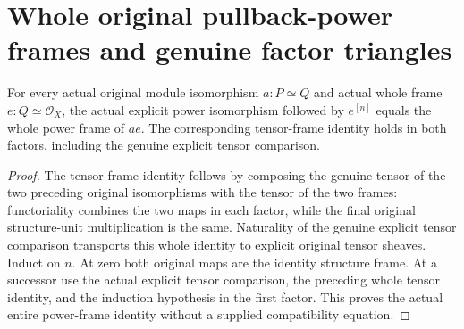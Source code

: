 \section{Whole original pullback-power frames and genuine factor triangles}

\begin{lemma}\label{lem:fc-actual-power-frame-iso-naturality}
\leanok
{}
For every actual original module isomorphism $a:P\simeq Q$ and
actual whole frame $e:Q\simeq\mathcal O_X$, the actual explicit
power isomorphism followed by $e^{[n]}$ equals the whole power
frame of $ae$. The corresponding tensor-frame identity holds in
both factors, including the genuine explicit tensor comparison.
\end{lemma}
\begin{proof}
The tensor frame identity follows by composing the genuine tensor
of the two preceding original isomorphisms with the tensor of the
two frames: functoriality combines the two maps in each factor,
while the final original structure-unit multiplication is the same.
Naturality of the genuine explicit tensor comparison transports
this whole identity to explicit original tensor sheaves. Induct
on $n$. At zero both original maps are the identity structure
frame. At a successor use the actual explicit tensor comparison,
the preceding whole tensor identity, and the induction hypothesis
in the first factor. This proves the actual entire power-frame
identity without a supplied compatibility equation.
\end{proof}

